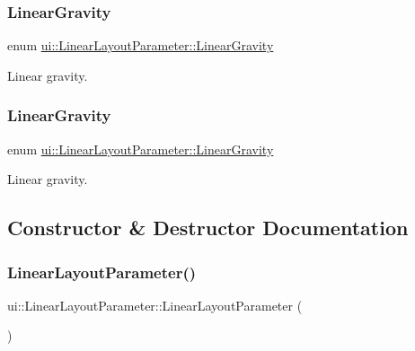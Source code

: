\subsubsection{\texorpdfstring{Linear\+Gravity}{LinearGravity}\hspace{0.1cm}{\footnotesize\ttfamily [1/2]}}
{\footnotesize\ttfamily enum \hyperlink{classui_1_1LinearLayoutParameter_a2045fd6c06860357e95bccdf2531fe08}{ui\+::\+Linear\+Layout\+Parameter\+::\+Linear\+Gravity}\hspace{0.3cm}{\ttfamily [strong]}}

Linear gravity. \mbox{\label{classui_1_1LinearLayoutParameter_a2045fd6c06860357e95bccdf2531fe08}} 
\subsubsection{\texorpdfstring{Linear\+Gravity}{LinearGravity}\hspace{0.1cm}{\footnotesize\ttfamily [2/2]}}
{\footnotesize\ttfamily enum \hyperlink{classui_1_1LinearLayoutParameter_a2045fd6c06860357e95bccdf2531fe08}{ui\+::\+Linear\+Layout\+Parameter\+::\+Linear\+Gravity}\hspace{0.3cm}{\ttfamily [strong]}}

Linear gravity. 

\subsection{Constructor \& Destructor Documentation}
\mbox{\label{classui_1_1LinearLayoutParameter_a31ae7f56fcfe826ad8355f654d1e1546}} 
\subsubsection{\texorpdfstring{Linear\+Layout\+Parameter()}{LinearLayoutParameter()}\hspace{0.1cm}{\footnotesize\ttfamily [1/2]}}
{\footnotesize\ttfamily ui\+::\+Linear\+Layout\+Parameter\+::\+Linear\+Layout\+Parameter (\begin{DoxyParamCaption}{ }\end{DoxyParamCaption})\hspace{0.3cm}{\ttfamily [inline]}}

